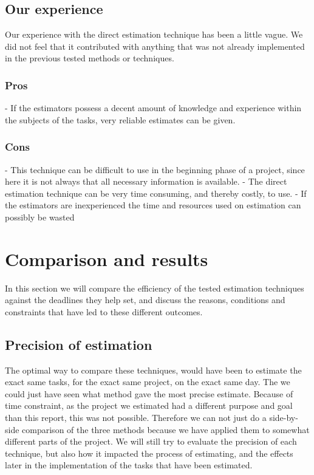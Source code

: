 \subsection{Our experience}
Our experience with the direct estimation technique has been a little vague. We did not feel that it contributed with anything that was not already implemented in the previous tested methods or techniques. 

\subsubsection{Pros}
- If the estimators possess a decent amount of knowledge and experience within the subjects of the tasks, very reliable estimates can be given. 

\subsubsection{Cons}
- This technique can be difficult to use in the beginning phase of a project, since here it is not always that all necessary information is available.
- The direct estimation technique can be very time consuming, and thereby costly, to use.
- If the estimators are inexperienced the time and resources used on estimation can possibly be wasted


\section{Comparison and results}

In this section we will compare the efficiency of the tested estimation techniques against the deadlines they help set, and discuss the reasons, conditions and constraints that have led to these different outcomes.

\subsection{Precision of estimation}
The optimal way to compare these techniques, would have been to estimate the exact same tasks, for the exact same project, on the exact same day. The we could just have seen what method gave the most precise estimate. Because of time constraint, as the project we estimated had a different purpose and goal than this report, this was not possible. Therefore we can not just do a side-by-side comparison of the three methods because we have applied them to somewhat different parts of the project. We will still try to evaluate the precision of each technique, but also how it impacted the process of estimating, and the effects later in the implementation of the tasks that have been estimated. \



